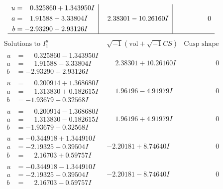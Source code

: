 \documentclass[1p]{elsarticle_modified}
\theoremstyle{definition}
\newcommand{\I}{\sqrt{-1}}
\begin{document}
$$\begin{array}{c|c|c}
\begin{aligned}
u &= \phantom{-}0.325860 + 1.343950 I \\
a &= \phantom{-}1.91588 + 3.33804 I \\
b &= -2.93290 - 2.93126 I\end{aligned}
 & \phantom{-}2.38301 - 10.26160 I & \phantom{-0.000000 } 0\\
 \hline 
 \end{array}$$\newpage$$\begin{array}{c|c|c}  
\text{Solutions to }I^u_{1}& \I (\text{vol} + \sqrt{-1}CS) & \text{Cusp shape}\\
 \hline 
\begin{aligned}
u &= \phantom{-}0.325860 - 1.343950 I \\
a &= \phantom{-}1.91588 - 3.33804 I \\
b &= -2.93290 + 2.93126 I\end{aligned}
 & \phantom{-}2.38301 + 10.26160 I & \phantom{-0.000000 } 0 \\ \hline\begin{aligned}
u &= \phantom{-}0.200914 + 1.368680 I \\
a &= \phantom{-}1.313830 + 0.182615 I \\
b &= -1.93679 + 0.32568 I\end{aligned}
 & \phantom{-}1.96196 - 4.91979 I & \phantom{-0.000000 } 0 \\ \hline\begin{aligned}
u &= \phantom{-}0.200914 - 1.368680 I \\
a &= \phantom{-}1.313830 - 0.182615 I \\
b &= -1.93679 - 0.32568 I\end{aligned}
 & \phantom{-}1.96196 + 4.91979 I & \phantom{-0.000000 } 0 \\ \hline\begin{aligned}
u &= -0.344918 + 1.344910 I \\
a &= -2.19325 + 0.39504 I \\
b &= \phantom{-}2.16703 + 0.59757 I\end{aligned}
 & -2.20181 + 8.74640 I & \phantom{-0.000000 } 0 \\ \hline\begin{aligned}
u &= -0.344918 - 1.344910 I \\
a &= -2.19325 - 0.39504 I \\
b &= \phantom{-}2.16703 - 0.59757 I\end{aligned}
 & -2.20181 - 8.74640 I & \phantom{-0.000000 } 0 \\ \hline\begin{aligned}

\end{aligned}
\end{array}$$
\end{document}
